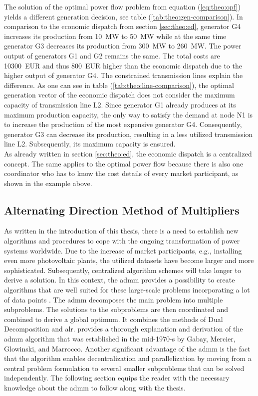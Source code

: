 The solution of the optimal power flow problem from equation (\ref{eq:theo:opf}) yields a different generation decision, see table (\ref{tab:theo:gen-comparison}). In comparison to the economic dispatch from section \ref{sec:theo:ed}, generator G4 increases its production from \SI{10}{\mega\watt} to \SI{50}{\mega\watt} while at the same time generator G3 decreases its production from \SI{300}{\mega\watt} to \SI{260}{\mega\watt}. The power output of generators G1 and G2 remains the same. The total costs are \SI{10300}{EUR} and thus \SI{800}{EUR} higher than the economic dispatch due to the higher output of generator G4. The constrained transmission lines explain the difference. As one can see in table (\ref{tab:theo:line-comparison}), the optimal generation vector of the economic dispatch does not consider the maximum capacity of transmission line L2. Since generator G1 already produces at its maximum production capacity, the only way to satisfy the demand at node N1 is to increase the production of the most expensive generator G4. Consequently, generator G3 can decrease its production, resulting in a less utilized transmission line L2. Subsequently, its maximum capacity is ensured. \\

As already written in section \ref{sec:theo:ed}, the economic dispatch is a centralized concept. The same applies to the optimal power flow because there is also one coordinator who has to know the cost details of every market participant, as shown in the example above. 

\subsection{Alternating Direction Method of Multipliers}

As written in the introduction of this thesis, there is a need to establish new algorithms and procedures to cope with the ongoing transformation of power systems worldwide. Due to the increase of market participants, e.g., installing even more photovoltaic plants, the utilized datasets have become larger and more sophisticated. Subsequently, centralized algorithm schemes will take longer to derive a solution. In this context, the \gls{admm} provides a possibility to create algorithms that are well suited for these large-scale problems incorporating a lot of data points \citep{boyd2010}. The \gls{admm} decomposes the main problem into multiple subproblems. The solutions to the subproblems are then coordinated and combined to derive a global optimum. It combines the methods of Dual Decomposition and \gls{alr}. \citet{boyd2010} provides a thorough explanation and derivation of the \gls{admm} algorithm that was established in the mid-1970-s by Gabay, Mercier, Glowinski, and Marrocco. Another significant advantage of the \gls{admm} is the fact that the algorithm enables decentralization and parallelization by moving from a central problem formulation to several smaller subproblems that can be solved independently. The following section equips the reader with the necessary knowledge about the \gls{admm} to follow along with the thesis.\\

